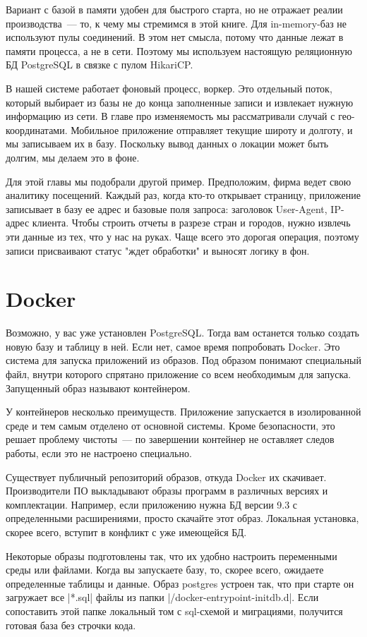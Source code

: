 Вариант с базой в памяти удобен для быстрого старта, но не отражает реалии
производства~--- то, к чему мы стремимся в этой книге. Для in-memory-баз не
используют пулы соединений. В этом нет смысла, потому что данные лежат в памяти
процесса, а не в сети. Поэтому мы используем настоящую реляционную БД PostgreSQL
в связке с пулом HikariCP.

В нашей системе работает фоновый процесс, воркер. Это отдельный поток, который
выбирает из базы не до конца заполненные записи и извлекает нужную информацию из
сети. В главе про изменяемость мы рассматривали случай с
гео-координатами. Мобильное приложение отправляет текущие широту и долготу, и мы
записываем их в базу. Поскольку вывод данных о локации может быть долгим, мы
делаем это в фоне.

Для этой главы мы подобрали другой пример. Предположим, фирма ведет свою
аналитику посещений. Каждый раз, когда кто-то открывает страницу, приложение
записывает в базу ее адрес и базовые поля запроса: заголовок User-Agent,
IP-адрес клиента. Чтобы строить отчеты в разрезе стран и городов, нужно извлечь
эти данные из тех, что у нас на руках. Чаще всего это дорогая операция, поэтому
записи присваивают статус "ждет обработки" и выносят логику в фон.

\section{Docker}

Возможно, у вас уже установлен PostgreSQL. Тогда вам останется только создать
новую базу и таблицу в ней. Если нет, самое время попробовать Docker. Это
система для запуска приложений из образов. Под образом понимают специальный
файл, внутри которого спрятано приложение со всем необходимым для
запуска. Запущенный образ называют контейнером.

У контейнеров несколько преимуществ. Приложение запускается в изолированной
среде и тем самым отделено от основной системы. Кроме безопасности, это решает
проблему чистоты~--- по завершении контейнер не оставляет следов работы, если это
не настроено специально.

Существует публичный репозиторий образов, откуда Docker их
скачивает. Производители ПО выкладывают образы программ в различных версиях и
комплектации. Например, если приложению нужна БД версии 9.3 с определенными
расширениями, просто скачайте этот образ. Локальная установка, скорее всего,
вступит в конфликт с уже имеющейся БД.

Некоторые образы подготовлены так, что их удобно настроить переменными среды или
файлами. Когда вы запускаете базу, то, скорее всего, ожидаете определенные
таблицы и данные. Образ postgres устроен так, что при старте он загружает все
\spverb|*.sql| файлы из папки \spverb|/docker-entrypoint-initdb.d|. Если сопоставить этой
папке локальный том с sql-схемой и миграциями, получится готовая база без
строчки кода.

